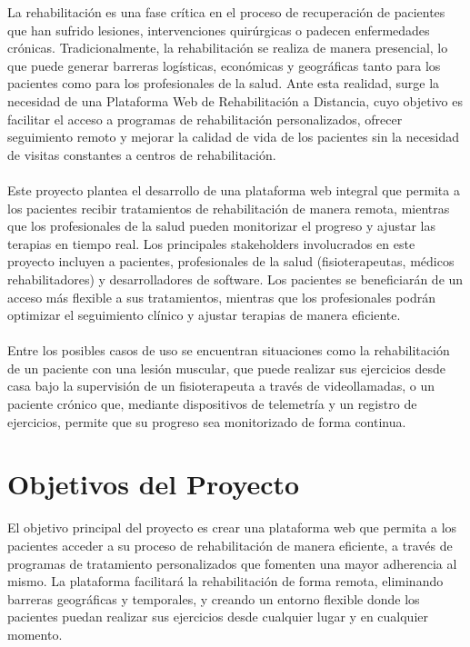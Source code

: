 \documentclass{article}
\begin{document}
La rehabilitación es una fase crítica en el proceso de recuperación de pacientes que han sufrido lesiones, intervenciones quirúrgicas o padecen enfermedades crónicas. Tradicionalmente, la rehabilitación se realiza de manera presencial, lo que puede generar barreras logísticas, económicas y geográficas tanto para los pacientes como para los profesionales de la salud. Ante esta realidad, surge la necesidad de una Plataforma Web de Rehabilitación a Distancia, cuyo objetivo es facilitar el acceso a programas de rehabilitación personalizados, ofrecer seguimiento remoto y mejorar la calidad de vida de los pacientes sin la necesidad de visitas constantes a centros de rehabilitación.
\\
\\
Este proyecto plantea el desarrollo de una plataforma web integral que permita a los pacientes recibir tratamientos de rehabilitación de manera remota, mientras que los profesionales de la salud pueden monitorizar el progreso y ajustar las terapias en tiempo real. Los principales stakeholders involucrados en este proyecto incluyen a pacientes, profesionales de la salud (fisioterapeutas, médicos rehabilitadores) y desarrolladores de software. Los pacientes se beneficiarán de un acceso más flexible a sus tratamientos, mientras que los profesionales podrán optimizar el seguimiento clínico y ajustar terapias de manera eficiente.
\\
\\
Entre los posibles casos de uso se encuentran situaciones como la rehabilitación de un paciente con una lesión muscular, que puede realizar sus ejercicios desde casa bajo la supervisión de un fisioterapeuta a través de videollamadas, o un paciente crónico que, mediante dispositivos de telemetría y un registro de ejercicios, permite que su progreso sea monitorizado de forma continua.


\section{Objetivos del Proyecto}
El objetivo principal del proyecto es crear una plataforma web que permita a los pacientes acceder a su proceso de rehabilitación de manera eficiente, a través de programas de tratamiento personalizados que fomenten una mayor adherencia al mismo. La plataforma facilitará la rehabilitación de forma remota, eliminando barreras geográficas y temporales, y creando un entorno flexible donde los pacientes puedan realizar sus ejercicios desde cualquier lugar y en cualquier momento.
\\
\end{document}
